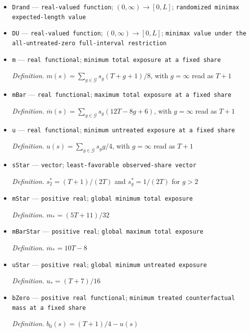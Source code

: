 \documentclass{article}
\begin{document}
\begin{itemize}
  \item \texttt{Drand} --- \texttt{real-\allowbreak{}valued function}; \((0,\infty)\to[0,L]\); \texttt{randomized minimax expected-\allowbreak{}length value}
  \item \texttt{DU} --- \texttt{real-\allowbreak{}valued function}; \((0,\infty)\to[0,L]\); \texttt{minimax value under the all-\allowbreak{}untreated-\allowbreak{}zero full-\allowbreak{}interval restriction}
  \item \texttt{m} --- \texttt{real functional}; \texttt{minimum total exposure at a fixed share}
  \par\smallskip\noindent\emph{Definition.} \(m(s)=\sum_{g\in\mathcal G}s_g(T+g+1)/8\), with \(g=\infty\) read as \(T+1\)
  \item \texttt{mBar} --- \texttt{real functional}; \texttt{maximum total exposure at a fixed share}
  \par\smallskip\noindent\emph{Definition.} \(\overline m(s)=\sum_{g\in\mathcal G}s_g(12T-8g+6)\), with \(g=\infty\) read as \(T+1\)
  \item \texttt{u} --- \texttt{real functional}; \texttt{minimum untreated exposure at a fixed share}
  \par\smallskip\noindent\emph{Definition.} \(u(s)=\sum_{g\in\mathcal G}s_gg/4\), with \(g=\infty\) read as \(T+1\)
  \item \texttt{sStar} --- \texttt{vector}; \texttt{least-\allowbreak{}favorable observed-\allowbreak{}share vector}
  \par\smallskip\noindent\emph{Definition.} \(s^*_2=(T+1)/(2T)\) and \(s^*_g=1/(2T)\) for \(g>2\)
  \item \texttt{mStar} --- \texttt{positive real}; \texttt{global minimum total exposure}
  \par\smallskip\noindent\emph{Definition.} \(m_*=(5T+11)/32\)
  \item \texttt{mBarStar} --- \texttt{positive real}; \texttt{global maximum total exposure}
  \par\smallskip\noindent\emph{Definition.} \(\overline m_*=10T-8\)
  \item \texttt{uStar} --- \texttt{positive real}; \texttt{global minimum untreated exposure}
  \par\smallskip\noindent\emph{Definition.} \(u_*=(T+7)/16\)
  \item \texttt{bZero} --- \texttt{positive real functional}; \texttt{minimum treated counterfactual mass at a fixed share}
  \par\smallskip\noindent\emph{Definition.} \(b_0(s)=(T+1)/4-u(s)\)

\end{itemize}
\end{document}

